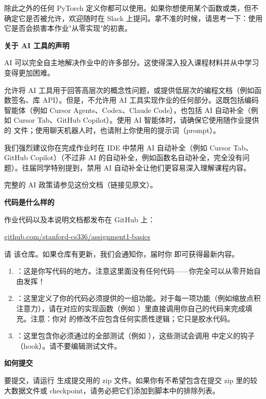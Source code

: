除此之外的任何 PyTorch 定义你都可以使用。如果你想使用某个函数或类，但不确定它是否被允许，欢迎随时在 Slack 上提问。拿不准的时候，请思考一下：使用它是否会损害本作业"从零实现"的初衷。

\textbf{关于 AI 工具的声明}

AI 可以完全自主地解决作业中的许多部分。这使得深入投入课程材料并从中学习变得更加困难。

允许将 AI 工具用于回答高层次的概念性问题，或提供低层次的编程文档（例如函数签名、库 API）。但是，不允许用 AI 工具实现作业的任何部分。这既包括编码智能体（例如 Cursor Agents、Codex、Claude Code），也包括 AI 自动补全（例如 Cursor Tab、GitHub Copilot）。使用 AI 智能体时，请确保它使用随作业提供的  文件；使用聊天机器人时，也请附上你使用的提示词（prompt）。

我们强烈建议你在完成作业时在 IDE 中禁用 AI 自动补全（例如 Cursor Tab、GitHub Copilot）（不过非 AI 的自动补全，例如函数名自动补全，完全没有问题）。往届同学特别提到，禁用 AI 自动补全让他们更容易深入理解课程内容。

完整的 AI 政策请参见这份文档（链接见原文）。

\textbf{代码是什么样的}

作业代码以及本说明文档都发布在 GitHub 上：

\begin{center}
\url{github.com/stanford-cs336/assignment1-basics}
\end{center}

请  该仓库。如果仓库有更新，我们会通知你，届时你  即可获得最新内容。
\begin{enumerate}
  \item {}：这是你写代码的地方。注意这里面没有任何代码——你完全可以从零开始自由发挥！
  \item {}：这里定义了你的代码必须提供的一组功能。对于每一项功能（例如缩放点积注意力），请在对应的实现函数（例如 ）里直接调用你自己的代码来完成填充。注意：你对  的修改不应包含任何实质性逻辑；它只是胶水代码。
  \item {}：这里包含你必须通过的全部测试（例如 ），这些测试会调用  中定义的钩子（hook）。请不要编辑测试文件。
\end{enumerate}

\textbf{如何提交}

要提交，请运行  生成提交用的 zip 文件。如果你有不希望包含在提交 zip 里的较大数据文件或 checkpoint，请务必把它们添加到脚本中的排除列表。

